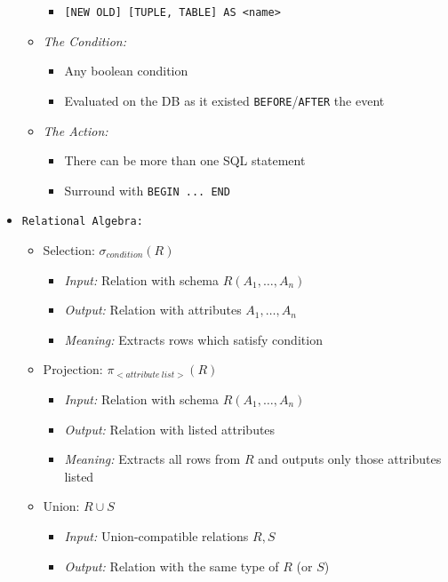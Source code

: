 \documentclass[landscape,8pt]{extarticle}
\newcommand{\code}{\lstinline}
\begin{document}
\begin{multicols}{4}
\begin{itemize}
\begin{itemize}
\begin{itemize}
            \item \code{[NEW OLD] [TUPLE, TABLE] AS <name>}
        \end{itemize}
        \item \emph{The Condition:}
        \begin{itemize}
            \item Any boolean condition
            \item Evaluated on the DB as it existed \code{BEFORE}/\code{AFTER} the event
        \end{itemize}
        \item \emph{The Action:}
        \begin{itemize}
            \item There can be more than one SQL statement
            \item Surround with \code{BEGIN ... END}
        \end{itemize}
    \end{itemize}
    \item \code{Relational Algebra:}
    \begin{itemize}
        \item Selection: $\sigma_{condition}(R)$
        \begin{itemize}
            \item \emph{Input:} Relation with schema $R(A_1, \dots, A_n)$
            \item \emph{Output:} Relation with attributes $A_1, \dots, A_n$
            \item \emph{Meaning:} Extracts rows which satisfy condition
        \end{itemize}
        \item Projection: $\pi_{<attribute\ list>}(R)$
        \begin{itemize}
            \item \emph{Input:} Relation with schema $R(A_1, \dots, A_n)$
            \item \emph{Output:} Relation with listed attributes
            \item \emph{Meaning:} Extracts all rows from $R$ and outputs only those attributes listed
        \end{itemize}
            \item Union: $R \cup S$
            \begin{itemize}
                \item \emph{Input:} Union-compatible relations $R,S$
                \item \emph{Output:} Relation with the same type of $R$ (or $S$)

\end{itemize}
\end{itemize}
\end{itemize}
\end{multicols}
\end{document}
